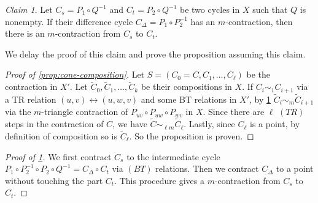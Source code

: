 \documentclass[10pt,a4paper]{article}
\newcommand{\prettyref}[1]{\cref{#1}}
\theoremstyle{definition}
\theoremstyle{remark}
\newtheorem{claim}[theorem]{Claim}
\def\cont{f}
\numberwithin{equation}{section}
\let\pref=\prettyref
\def\cont{S}
\begin{document}
\begin{claim} \label{claim:shift-between-paths}
    Let \(C_s = P_1 \circ Q^{-1}\) and \( C_t = P_2 \circ Q^{-1}\) be two cycles in $X$ such that $Q$ is nonempty. If their difference cycle $C_\Delta = P_1 \circ P_2^{-1}$ has an \(m\)-contraction, then there is an \(m\)-contraction from \(C_s\) to \(C_t \).
\end{claim}

We delay the proof of this claim and prove the proposition assuming this claim.

\begin{proof}[Proof of \pref{prop:cone-composition}]
    Let \(\cont = (C_0 = C, C_1,\dots,C_\ell)\) be the contraction in $X'$. Let \(\tilde{C}_0,\tilde{C}_1,\dots,\tilde{C}_k\) be their compositions in $X$. If \(C_i \sim_1 C_{i+1}\) via a TR relation \((u,v) \leftrightarrow (u,w,v)\) and some BT relations in $X'$, by \pref{claim:shift-between-paths} \(\tilde{C}_i \sim_m \tilde{C}_{i+1}\) via the $m$-triangle contraction of \(P_{uv} \circ P_{uw} \circ P_{wv}\) in $X$. 
    Since there are $\ell$ \((TR)\) steps in the contraction of $C$, we have $\tilde{C} \sim_{\ell m} \tilde{C}_\ell$. Lastly, since \(C_\ell\) is a point, by definition of composition so is \(\tilde{C}_\ell\). So the proposition is proven.
\end{proof}


\begin{proof}[Proof of \pref{claim:shift-between-paths}]
    We first contract \(C_s\) to the intermediate cycle \(P_1 \circ P_2^{-1} \circ P_2 \circ Q^{-1} = C_\Delta \circ C_t\) via \((BT)\) relations. Then we contract \(C_\Delta \) to a point without touching the part \(C_t\). This procedure gives a $m$-contraction from $C_s$ to $C_t$.
\end{proof}
\end{document}
